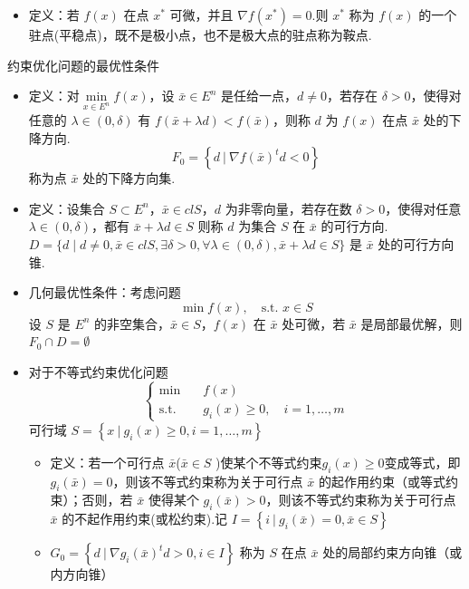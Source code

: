 \begin{remark}
    \text{}\begin{itemize}
        \item 定义：若 $f(x)$ 在点 $x^*$ 可微，并且 $\nabla f(x^*) = 0$.则 $x^*$ 称为 $f(x)$ 的一个驻点(平稳点)，既不是极小点，也不是极大点的驻点称为鞍点.
    \end{itemize}
\end{remark}

\begin{remark}
    约束优化问题的最优性条件
    \begin{itemize}
        \item 定义：对$\underset{x \in E^n}{\min}f(x)$，设 $\bar{x} \in E^n$ 是任给一点，$d\neq 0$，若存在 $\delta > 0$，使得对任意的 $\lambda \in (0, \delta)$ 有 $f(\bar{x} + \lambda d) < f(\bar{x})$，则称 $d$ 为 $f(x)$ 在点 $\bar{x}$ 处的下降方向.\[F_0 = \left\{d\ |\ \nabla f(\bar{x})^td < 0\right\}\]称为点 $\bar{x}$ 处的下降方向集.
        \item 定义：设集合 $S \subset E^n$，$\bar{x} \in clS$，$d$ 为非零向量，若存在数 $\delta > 0$，使得对任意 $\lambda \in (0, \delta)$，都有 $\bar{x} + \lambda d \in S$ 则称 $d$ 为集合 $S$ 在 $\bar{x}$ 的可行方向.$D=\{d \mid d \neq 0, \bar{x} \in c l S, \exists \delta>0, \forall \lambda \in(0, \delta), \bar{x}+\lambda d \in S\}$ 是 $\bar{x}$ 处的可行方向锥.
        \item 几何最优性条件：考虑问题\[\min f(x), \quad \text{s.t. } x \in S\]设 $S$ 是 $E^n$ 的非空集合，$\bar{x} \in S$，$f(x)$ 在 $\bar{x}$ 处可微，若 $\bar{x}$ 是局部最优解，则 $F_0\cap D = \emptyset$
        \item 对于不等式约束优化问题\[\begin{cases}
            \min \quad &f(x)\\
            \text{s.t.} \quad &g_i(x) \ge 0, \quad i = 1, \dots, m
        \end{cases}\]
        可行域 $S = \left\{x\ |\ g_i(x) \ge 0, i = 1, \dots, m\right\}$
        \begin{itemize}
            \item 定义：若一个可行点 $\bar{x}$($\bar{x} \in S$ )使某个不等式约束$g_i(x) \ge 0$变成等式，即 $g_i(\bar{x}) = 0$，则该不等式约束称为关于可行点 $\bar{x}$ 的起作用约束（或等式约束）；否则，若 $\bar{x}$ 使得某个 $g_i(\bar{x}) > 0$，则该不等式约束称为关于可行点 $\bar{x}$ 的不起作用约束(或松约束).记 $I = \left\{i\ |\ g_i(\bar{x}) = 0, \bar{x} \in S\right\}$
            \item $G_0 = \left\{d \ |\ \nabla g_i(\bar{x})^td > 0, i \in I\right\}$ 称为 $S$ 在点 $\bar{x}$ 处的局部约束方向锥（或内方向锥）

\end{itemize}
\end{itemize}
\end{remark}
